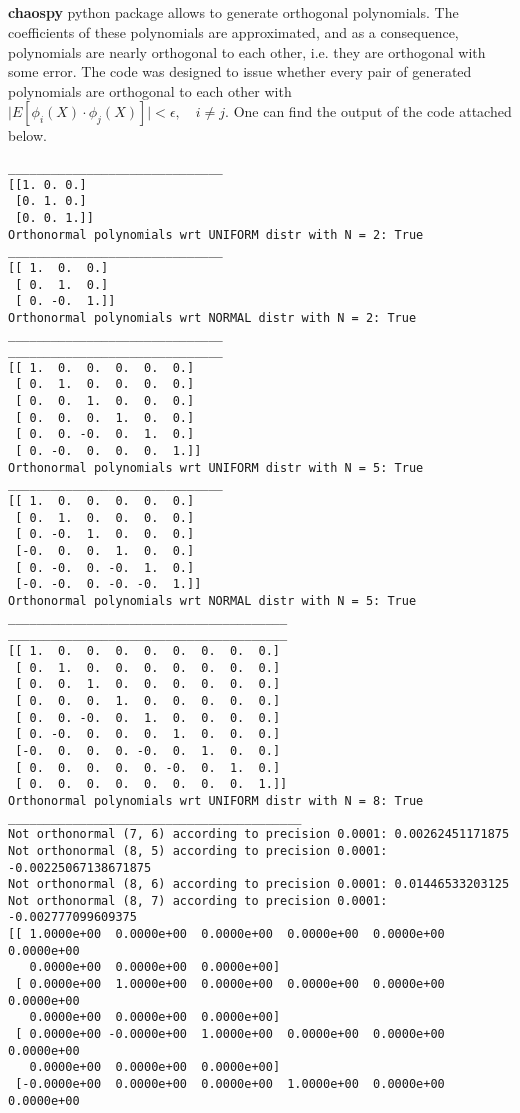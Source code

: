 \documentclass[11pt]{article}
\newcommand{\subass}{\subsection{}}
\begin{document}
\subass
\textbf{chaospy} python package allows to generate orthogonal polynomials. The coefficients of these polynomials are approximated, and as a consequence, polynomials are nearly orthogonal to each other, i.e. they are orthogonal with some error. The code was designed to issue whether every pair of generated polynomials are orthogonal to each other with $ \biggl \lvert{ E[\phi_i (X) \cdot \phi_j(X)] } \biggr \rvert < \epsilon, \quad i \neq j$. One can find the output of the code attached below.

\begin{lstlisting}
______________________________
[[1. 0. 0.]
 [0. 1. 0.]
 [0. 0. 1.]]
Orthonormal polynomials wrt UNIFORM distr with N = 2: True
______________________________
[[ 1.  0.  0.]
 [ 0.  1.  0.]
 [ 0. -0.  1.]]
Orthonormal polynomials wrt NORMAL distr with N = 2: True
______________________________
______________________________
[[ 1.  0.  0.  0.  0.  0.]
 [ 0.  1.  0.  0.  0.  0.]
 [ 0.  0.  1.  0.  0.  0.]
 [ 0.  0.  0.  1.  0.  0.]
 [ 0.  0. -0.  0.  1.  0.]
 [ 0. -0.  0.  0.  0.  1.]]
Orthonormal polynomials wrt UNIFORM distr with N = 5: True
______________________________
[[ 1.  0.  0.  0.  0.  0.]
 [ 0.  1.  0.  0.  0.  0.]
 [ 0. -0.  1.  0.  0.  0.]
 [-0.  0.  0.  1.  0.  0.]
 [ 0. -0.  0. -0.  1.  0.]
 [-0. -0.  0. -0. -0.  1.]]
Orthonormal polynomials wrt NORMAL distr with N = 5: True
_______________________________________
_______________________________________
[[ 1.  0.  0.  0.  0.  0.  0.  0.  0.]
 [ 0.  1.  0.  0.  0.  0.  0.  0.  0.]
 [ 0.  0.  1.  0.  0.  0.  0.  0.  0.]
 [ 0.  0.  0.  1.  0.  0.  0.  0.  0.]
 [ 0.  0. -0.  0.  1.  0.  0.  0.  0.]
 [ 0. -0.  0.  0.  0.  1.  0.  0.  0.]
 [-0.  0.  0.  0. -0.  0.  1.  0.  0.]
 [ 0.  0.  0.  0.  0. -0.  0.  1.  0.]
 [ 0.  0.  0.  0.  0.  0.  0.  0.  1.]]
Orthonormal polynomials wrt UNIFORM distr with N = 8: True
_________________________________________
Not orthonormal (7, 6) according to precision 0.0001: 0.00262451171875
Not orthonormal (8, 5) according to precision 0.0001: -0.00225067138671875
Not orthonormal (8, 6) according to precision 0.0001: 0.01446533203125
Not orthonormal (8, 7) according to precision 0.0001: -0.002777099609375
[[ 1.0000e+00  0.0000e+00  0.0000e+00  0.0000e+00  0.0000e+00  0.0000e+00
   0.0000e+00  0.0000e+00  0.0000e+00]
 [ 0.0000e+00  1.0000e+00  0.0000e+00  0.0000e+00  0.0000e+00  0.0000e+00
   0.0000e+00  0.0000e+00  0.0000e+00]
 [ 0.0000e+00 -0.0000e+00  1.0000e+00  0.0000e+00  0.0000e+00  0.0000e+00
   0.0000e+00  0.0000e+00  0.0000e+00]
 [-0.0000e+00  0.0000e+00  0.0000e+00  1.0000e+00  0.0000e+00  0.0000e+00

\end{lstlisting}
\end{document}
